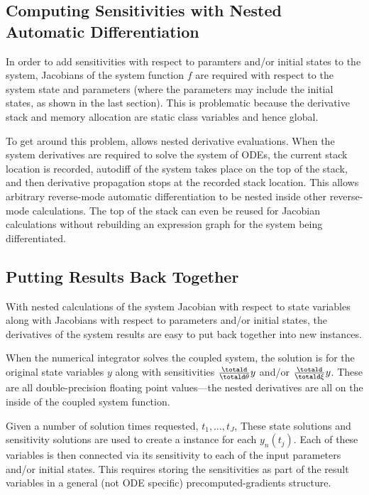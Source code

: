 \documentclass[10pt]{article}
\begin{document}
\subsection{Computing Sensitivities with Nested Automatic Differentiation}

In order to add sensitivities with respect to paramters and/or initial
states to the system, Jacobians of the system function $f$ are
required with respect to the system state and parameters (where the
parameters may include the initial states, as shown in the last
section).  This is problematic because the derivative stack and memory
allocation are static class variables and hence global.

To get around this problem,  allows nested
derivative evaluations.  When the system derivatives are required to
solve the system of ODEs, the current stack location is recorded,
autodiff of the system takes place on the top of the stack, and then
derivative propagation stops at the recorded stack location.  This
allows arbitrary reverse-mode automatic differentiation to be nested
inside other reverse-mode calculations.  The top of the stack can even
be reused for Jacobian calculations without rebuilding an expression
graph for the system being differentiated.

\subsection{Putting Results Back Together}

With nested calculations of the system Jacobian with respect to state
variables along with Jacobians with respect to parameters and/or
initial states, the derivatives of the system results are easy to put
back together into new  instances.  

When the numerical integrator solves the coupled system, the solution
is for the original state variables $y$ along with sensitivities
$\frac{\totald}{\totald \theta} y$ and/or $\frac{\totald}{\totald \xi}
y$.  These are all double-precision floating point values---the nested
derivatives are all on the inside of the coupled system function.

Given a number of solution times requested, $t_1,\ldots,t_J$, These
state solutions and sensitivity solutions are used to create a
 instance for each $y_n(t_j)$.  Each of these variables is
then connected via its sensitivity to each of the input parameters
and/or initial states.  This requires storing the sensitivities as
part of the result variables in a general (not ODE specific)
precomputed-gradients  structure.
\end{document}
